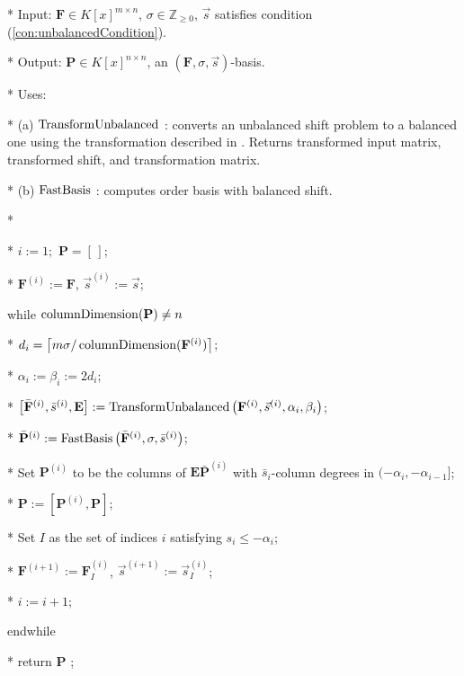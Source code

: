 \begin{algorithm}
\caption{$\umab\left(\mathbf{F},\sigma,\vec{s}\right)$ }


\label{alg:umab} 
\begin{algor}
\item [{{{*}}}] Input: $\mathbf{F}\in K\left[x\right]^{m\times n}$,
$\sigma\in\mathbb{Z}_{\ge0}$, $\vec{s}$ satisfies condition (\ref{con:unbalancedCondition}).
\item [{{{*}}}] Output: $\mathbf{P}\in K\left[x\right]^{n\times n}$,
an $\left(\mathbf{F},\sigma,\vec{s}\right)$-basis.
\item [{{{*}}}] Uses:
\item [{{*}}] (a) $\TransformUnbalanced$ : converts an unbalanced shift
problem to a balanced one using the transformation described in .
Returns transformed input matrix, transformed shift, and transformation
matrix.
\item [{{*}}] (b) %
$\mmab$ : computes order basis with balanced shift. 
\item [{{*}}]~\end{algor}
\begin{algor}[1]
\item [{{{*}}}]  $i:=1;$ $\mathbf{P}=[\,]$;
\item [{{{*}}}] $\mathbf{F}^{\left(i\right)}:=\mathbf{F}$, $\vec{s}^{\left(i\right)}:=\vec{s}$;
\item [{{while}}] $\columnDimension(\mathbf{P})\ne n$
\item [{{{*}}}] $d_{i}=\left\lceil m\sigma/\columnDimension(\mathbf{F}^{\left(i\right)})\right\rceil $;
\item [{{{*}}}] $\alpha_{i}:=\beta_{i}:=2d_{i};$
\item [{{{*}}}] $\left[\bar{\mathbf{F}}^{\left(i\right)},\bar{s}^{\left(i\right)},\mathbf{E}\right]:=\TransformUnbalanced\left(\mathbf{F}^{\left(i\right)},\vec{s}^{\left(i\right)},\alpha_{i},\beta_{i}\right)$;
\item [{{{*}}}] $\bar{\mathbf{P}}^{\left(i\right)}:=\mmab\left(\bar{\mathbf{F}}^{\left(i\right)},\sigma,\bar{s}^{\left(i\right)}\right)$;
\item [{{{*}}}] Set $\mathbf{P}^{\left(i\right)}$ to be the columns
of $\mathbf{E}\bar{\mathbf{P}}^{\left(i\right)}$ with $\bar{s}_{i}$-column
degrees in $(-\alpha_{i},-\alpha_{i-1}]$;
\item [{{{*}}}] $\mathbf{P}:=\left[\mathbf{P}^{\left(i\right)},\mathbf{P}\right]$;
\item [{{{*}}}] Set $I$ as the set of indices $i$ satisfying $s_{i}\le-\alpha_{i}$;
\item [{{{*}}}] $\mathbf{F}^{\left(i+1\right)}:=\mathbf{F}_{I}^{\left(i\right)}$,
$\vec{s}^{\left(i+1\right)}:=\vec{s}_{I}^{\left(i\right)}$;
\item [{{{*}}}] $i:=i+1$;
\item [{{endwhile}}] ~
\item [{{{*}}}] return $\mathbf{P}$ ; \end{algor}
\end{algorithm}

